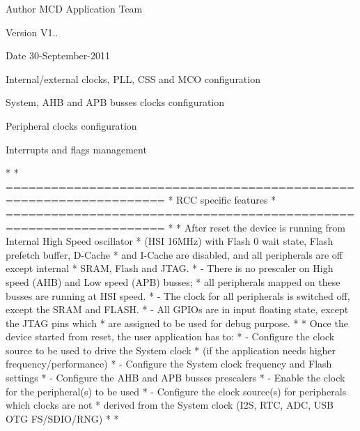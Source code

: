 \begin{DoxyAuthor}{Author}
M\+CD Application Team 
\end{DoxyAuthor}
\begin{DoxyVersion}{Version}
V1.. 
\end{DoxyVersion}
\begin{DoxyDate}{Date}
30-\/\+September-\/2011
\begin{DoxyItemize}
\item Internal/external clocks, P\+LL, C\+SS and M\+CO configuration
\item System, A\+HB and A\+PB busses clocks configuration
\item Peripheral clocks configuration
\item Interrupts and flags management
\end{DoxyItemize}
\end{DoxyDate}
\begin{DoxyVerb}*               
*          ===================================================================
*                               RCC specific features
*          ===================================================================
*    
*          After reset the device is running from Internal High Speed oscillator 
*          (HSI 16MHz) with Flash 0 wait state, Flash prefetch buffer, D-Cache 
*          and I-Cache are disabled, and all peripherals are off except internal
*          SRAM, Flash and JTAG.
*           - There is no prescaler on High speed (AHB) and Low speed (APB) busses;
*             all peripherals mapped on these busses are running at HSI speed.
*             - The clock for all peripherals is switched off, except the SRAM and FLASH.
*           - All GPIOs are in input floating state, except the JTAG pins which
*             are assigned to be used for debug purpose.
*        
*          Once the device started from reset, the user application has to:        
*           - Configure the clock source to be used to drive the System clock
*             (if the application needs higher frequency/performance)
*           - Configure the System clock frequency and Flash settings  
*           - Configure the AHB and APB busses prescalers
*           - Enable the clock for the peripheral(s) to be used
*           - Configure the clock source(s) for peripherals which clocks are not
*             derived from the System clock (I2S, RTC, ADC, USB OTG FS/SDIO/RNG)      
*                        
*  \end{DoxyVerb}


